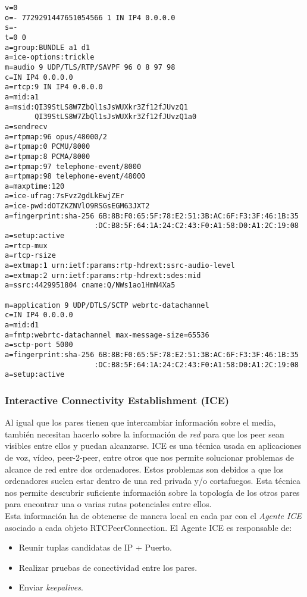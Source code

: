 \begin{lstlisting}[caption=Ejemplo paquete SDP]
v=0
o=- 7729291447651054566 1 IN IP4 0.0.0.0
s=-
t=0 0
a=group:BUNDLE a1 d1
a=ice-options:trickle
m=audio 9 UDP/TLS/RTP/SAVPF 96 0 8 97 98
c=IN IP4 0.0.0.0
a=rtcp:9 IN IP4 0.0.0.0
a=mid:a1
a=msid:QI39StLS8W7ZbQl1sJsWUXkr3Zf12fJUvzQ1
       QI39StLS8W7ZbQl1sJsWUXkr3Zf12fJUvzQ1a0
a=sendrecv
a=rtpmap:96 opus/48000/2
a=rtpmap:0 PCMU/8000
a=rtpmap:8 PCMA/8000
a=rtpmap:97 telephone-event/8000
a=rtpmap:98 telephone-event/48000
a=maxptime:120
a=ice-ufrag:7sFvz2gdLkEwjZEr
a=ice-pwd:dOTZKZNVlO9RSGsEGM63JXT2
a=fingerprint:sha-256 6B:8B:F0:65:5F:78:E2:51:3B:AC:6F:F3:3F:46:1B:35
                     :DC:B8:5F:64:1A:24:C2:43:F0:A1:58:D0:A1:2C:19:08
a=setup:active
a=rtcp-mux
a=rtcp-rsize
a=extmap:1 urn:ietf:params:rtp-hdrext:ssrc-audio-level
a=extmap:2 urn:ietf:params:rtp-hdrext:sdes:mid
a=ssrc:4429951804 cname:Q/NWs1ao1HmN4Xa5

m=application 9 UDP/DTLS/SCTP webrtc-datachannel
c=IN IP4 0.0.0.0
a=mid:d1
a=fmtp:webrtc-datachannel max-message-size=65536
a=sctp-port 5000
a=fingerprint:sha-256 6B:8B:F0:65:5F:78:E2:51:3B:AC:6F:F3:3F:46:1B:35
                     :DC:B8:5F:64:1A:24:C2:43:F0:A1:58:D0:A1:2C:19:08
a=setup:active
\end{lstlisting}


\subsubsection{Interactive Connectivity Establishment (ICE)}

Al igual que los pares tienen que intercambiar información sobre el media, también necesitan hacerlo sobre la información de \textit{red} para que los peer sean visibles entre ellos y puedan alcanzarse. ICE es una técnica usada en aplicaciones de voz, vídeo, peer-2-peer, entre otros que nos permite solucionar problemas de alcance de red entre dos ordenadores. Estos problemas son debidos a que los ordenadores suelen estar dentro de una red privada y/o cortafuegos. Esta técnica nos permite descubrir suficiente información sobre la topología de los otros pares para encontrar una o varias rutas potenciales entre ellos.\\

Esta información ha de obtenerse de manera local en cada par con el \textit{Agente ICE} asociado a cada objeto RTCPeerConnection. El Agente ICE es responsable de: 

\begin{itemize}
\item Reunir tuplas candidatas de IP + Puerto.
\item Realizar pruebas de conectividad entre los pares.
\item Enviar \textit{keepalives}.
\end{itemize}

